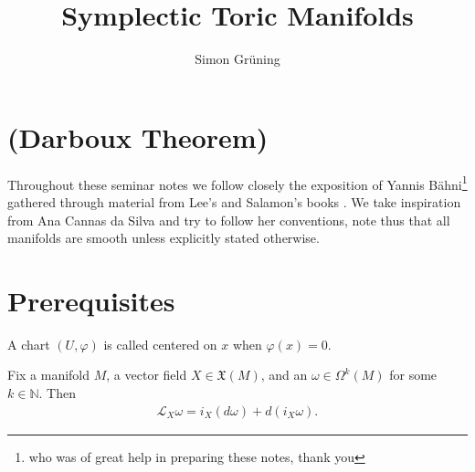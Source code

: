 
 




\title{Symplectic Toric Manifolds}
\author{Simon Gr\"uning}
\address[Simon Gr\"uning]{ETH Zürich, Rämistrasse 101, 8092 Zürich}

\let\Psi\psi

\maketitle

\section*{(Darboux Theorem)}


\clearpage

Throughout these seminar notes we follow closely the exposition of Yannis B\"ahni\footnote{ who was of great help in preparing these notes, thank you} \cite{ybaehn} gathered through material from Lee's \cite{lee1} \cite{lee2} and Salamon's books \cite{salamon}. We take inspiration from Ana Cannas da Silva \cite{ana} and try to follow her conventions, note thus that all manifolds are smooth unless explicitly stated otherwise.


\section{Prerequisites}

\begin{remark}


A chart $(U,\varphi)$ is called centered on $x$ when $\varphi(x) = 0$.




\end{remark}

\begin{proposition}
\cite{ybaehn}
Fix a manifold $M$, a vector field $X \in \mathfrak{X}(M)$, and an $\omega \in \Omega^k(M)$ for some $k \in \mathbb{N}$. Then
\begin{align*}
\mathcal{L}_X \omega = i_X(d \omega) + d(i_X \omega).
\end{align*}
\end{proposition}


